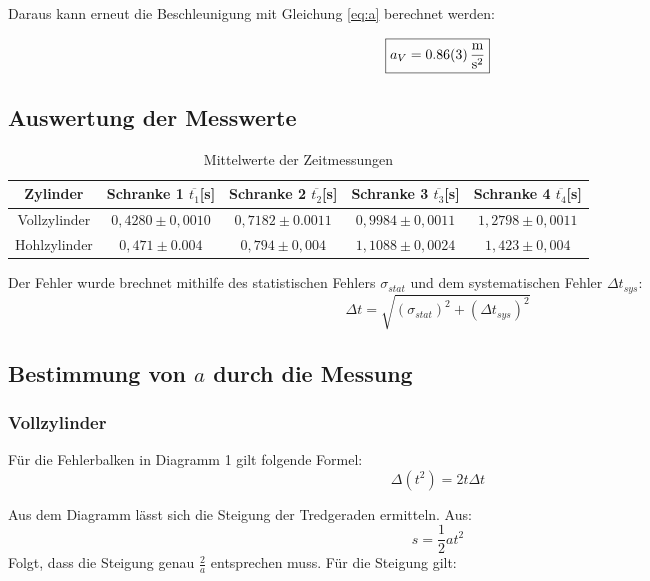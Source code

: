 Daraus kann erneut die Beschleunigung mit Gleichung \ref{eq:a} berechnet werden:

\[\boxed{a_V =  \SI{0,86 \pm 0,03}{\frac{\meter}{\second^2}}}\]


\subsection{Auswertung der Messwerte}

\begin{table}[h!]
    \centering
    \begin{tabular}{c c c c c}
        \toprule
        Zylinder & Schranke 1 $\overline{t_1}$[s] & Schranke 2 $\overline{t_2}$[s] & Schranke 3 $\overline{t_3}$[s] & Schranke 4 $\overline{t_4}$[s] \\
        \midrule
        Vollzylinder & $0,4280 \pm 0,0010 $ & $ 0,7182 \pm 0.0011$ & $0,9984 \pm 0,0011 $ & $ 1,2798 \pm 0,0011$\\
        Hohlzylinder & $0,471 \pm 0.004$ & $0,794 \pm 0,004$ & $1,1088 \pm 0,0024$ & $1,423 \pm 0,004$\\
        \bottomrule
    \end{tabular}
    \caption{Mittelwerte der Zeitmessungen}
\end{table}

Der Fehler wurde brechnet mithilfe des statistischen Fehlers $\sigma_{stat}$ und dem systematischen Fehler $\Delta t_{sys}$:
\begin{equation}
    \Delta t = \sqrt{(\sigma_{stat})^2 + (\Delta t_{sys})^2}
    \label{eq:FehlerTab}
\end{equation}

\subsection{Bestimmung von $a$ durch die Messung}

\subsubsection{Vollzylinder}

Für die Fehlerbalken in Diagramm 1 gilt folgende Formel:
\begin{equation}
    \Delta (t^2) = 2t\Delta t
\end{equation}

Aus dem Diagramm lässt sich die Steigung der Tredgeraden ermitteln.
Aus:
\begin{equation}
    s = \frac{1}{2} at^2
\end{equation}
Folgt, dass die Steigung genau $\frac{2}{a}$ entsprechen muss.
Für die Steigung gilt:

